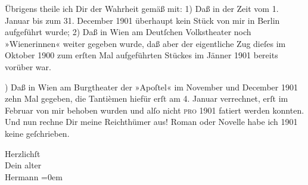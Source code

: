 \pstart
           Übrigens theile ich Dir der Wahrheit gemäß mit: 1) Daß in der Zeit vom 1. Januar bis
               zum 31. December 1901 überhaupt kein Stück von mir in Berlin aufgeführt wurde; {\pb}2) Daß in Wien am Deutſchen
                  Volkstheater noch »Wienerinnen« weiter
               gegeben wurde, daß aber der eigentliche Zug dieſes im Oktober 1900 zum erſten Mal
               aufgeführten Stückes im Jänner 1901 bereits vorüber war.\pend
           
) Daß in Wien am Burgtheater der »Apoſtel« im November
               und December 1901 zehn Mal gegeben, die {\pb}Tantièmen
               hiefür erſt am 4. Januar verrechnet, erſt im Februar von mir behoben wurden und alſo
               nicht \textsc{pro} 1901 fatiert werden konnten. Und nun rechne Dir
               meine Reichthümer aus! Roman oder Novelle habe ich 1901 keine geſchrieben.\pend
           
\pstart
           Herzlichſt{\\[\baselineskip]}Dein alter{\\[\baselineskip]}\spacefill\mbox{Hermann}\pend
           \leftskip=0em{}\endnumbering{}  
      